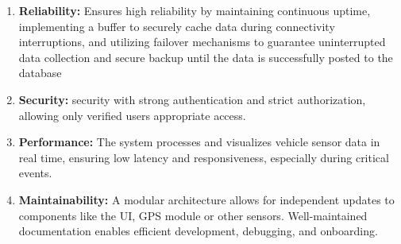 \begin{enumerate}
    \item \textbf{Reliability:}
    Ensures high reliability by maintaining continuous uptime, implementing a buffer to securely cache data during connectivity interruptions, and utilizing failover mechanisms to guarantee uninterrupted data collection and secure backup until the data is successfully posted to the database
    \item \textbf{Security:}
    security with strong authentication and strict authorization, allowing only verified users appropriate access.
    \item \textbf{Performance:}
    The system processes and visualizes vehicle sensor data in real time, ensuring low latency and responsiveness, especially during critical events.
    \item \textbf{Maintainability:}
    A modular architecture allows for independent updates to components like the UI, GPS module or other sensors. Well-maintained documentation enables efficient development, debugging, and onboarding.

\end{enumerate}
